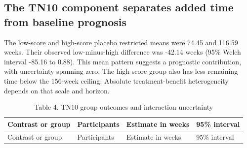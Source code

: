 \documentclass[
  american,
  11pt,
  letterpaper,
]{article}
\begin{document}
\subsection{The TN10 component separates added time from baseline
prognosis}\label{the-tn10-component-separates-added-time-from-baseline-prognosis}

The low-score and high-score placebo restricted means were 74.45 and
116.59 weeks. Their observed low-minus-high difference was \mbox{-42.14} weeks
(95\% Welch interval \mbox{-85.16} to 0.88). This mean pattern suggests a
prognostic contribution, with uncertainty spanning zero. The high-score
group also has less remaining time below the 156-week ceiling. Absolute
treatment-benefit heterogeneity depends on that scale and horizon.

\Needspace{4.1in}
\begin{longtable}[]{@{}
  >{\raggedright\arraybackslash}p{}
  >{\raggedleft\arraybackslash}p{}
  >{\raggedleft\arraybackslash}p{}
  >{\raggedright\arraybackslash}p{}@{}}
\caption{Table 4. TN10 group outcomes and interaction
uncertainty}\tabularnewline
\toprule\noalign{}
\begin{minipage}[b]{\linewidth}\raggedright
Contrast or group
\end{minipage} & \begin{minipage}[b]{\linewidth}\raggedleft
Participants
\end{minipage} & \begin{minipage}[b]{\linewidth}\raggedleft
Estimate in weeks
\end{minipage} & \begin{minipage}[b]{\linewidth}\raggedright
95\% interval
\end{minipage} \\
\midrule\noalign{}
\endfirsthead
\toprule\noalign{}
\begin{minipage}[b]{\linewidth}\raggedright
Contrast or group
\end{minipage} & \begin{minipage}[b]{\linewidth}\raggedleft
Participants
\end{minipage} & \begin{minipage}[b]{\linewidth}\raggedleft
Estimate in weeks
\end{minipage} & \begin{minipage}[b]{\linewidth}\raggedright
95\% interval

\end{minipage}
\end{longtable}
\end{document}
